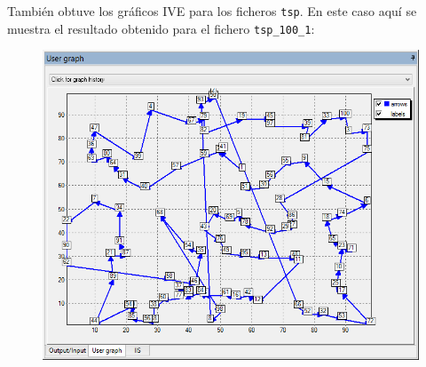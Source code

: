 \documentclass[a4paper,11pt]{article}
\begin{document}
También obtuve los gráficos IVE para los ficheros \texttt{tsp}. En este caso aquí se muestra el resultado obtenido para el fichero \texttt{tsp\_100\_1}:

\begin{figure}[!htbp]
	\centering
	\includegraphics[width=1.0\textwidth]{entorno_100_1.png}
\end{figure}
\end{document}
